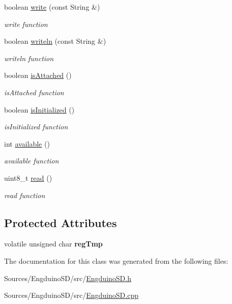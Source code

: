 \begin{DoxyCompactItemize}
boolean \hyperlink{group___engduino_s_d_ga609219465a1d1799c634dd30f4d85d4d}{write} (const String \&)
\begin{DoxyCompactList}\small\item\em write function \end{DoxyCompactList}\item 
boolean \hyperlink{group___engduino_s_d_ga63ef24253f224cd4d99ac47fac745c7f}{writeln} (const String \&)
\begin{DoxyCompactList}\small\item\em writeln function \end{DoxyCompactList}\item 
boolean \hyperlink{group___engduino_s_d_ga700248981ca6e35f9d9c3b6ea71ae8c2}{is\+Attached} ()
\begin{DoxyCompactList}\small\item\em is\+Attached function \end{DoxyCompactList}\item 
boolean \hyperlink{group___engduino_s_d_gaea10bd485fc67e6e44b96c12036098b5}{is\+Initialized} ()
\begin{DoxyCompactList}\small\item\em is\+Initialized function \end{DoxyCompactList}\item 
int \hyperlink{group___engduino_s_d_gae3d19c36792ef53fe572e763a77a93e5}{available} ()
\begin{DoxyCompactList}\small\item\em available function \end{DoxyCompactList}\item 
uint8\+\_\+t \hyperlink{group___engduino_s_d_ga7c333386f94dfd88ef309a685a7fa3db}{read} ()
\begin{DoxyCompactList}\small\item\em read function \end{DoxyCompactList}\end{DoxyCompactItemize}
\subsection*{Protected Attributes}
\begin{DoxyCompactItemize}
\item 
\hypertarget{class_engduino_s_d_class_ac9565882cfefb0acb99a37da4272203f}{}volatile unsigned char {\bfseries reg\+Tmp}\label{class_engduino_s_d_class_ac9565882cfefb0acb99a37da4272203f}

\end{DoxyCompactItemize}


The documentation for this class was generated from the following files\+:\begin{DoxyCompactItemize}
\item 
Sources/\+Engduino\+S\+D/src/\hyperlink{_engduino_s_d_8h}{Engduino\+S\+D.\+h}\item 
Sources/\+Engduino\+S\+D/src/\hyperlink{_engduino_s_d_8cpp}{Engduino\+S\+D.\+cpp}\end{DoxyCompactItemize}
